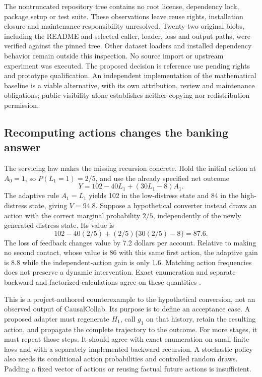 The nontruncated repository tree contains no root license, dependency
lock, package setup or test suite. These observations leave reuse rights,
installation closure and maintenance responsibility unresolved.
Twenty-two original blobs, including the README and selected caller,
loader, loss and output paths, were verified against the pinned tree.
Other dataset loaders and installed dependency behavior remain outside
this inspection. No source import or upstream experiment was executed.
The proposed decision is reference use pending rights and prototype
qualification. An independent implementation of the mathematical
baseline is a viable alternative, with its own attribution, review and
maintenance obligations; public visibility alone establishes neither
copying nor redistribution permission.

\subsection{Recomputing actions changes the banking answer}

The servicing law makes the missing recursion concrete. Hold the initial
action at $A_0=1$, so $P(L_1=1)=2/5$, and use the already specified
net outcome
\[
 Y=102-40L_1+(30L_1-8)A_1.
\]
The adaptive rule $A_1=L_1$ yields 102 in the low-distress state and 84
in the high-distress state, giving $V=94.8$.
Suppose a hypothetical converter instead draws an action with the correct
marginal probability $2/5$, independently of the newly generated distress
state. Its value is
\[
 102-40(2/5)+(2/5)\{30(2/5)-8\}=87.6.
\]
The loss of feedback changes value by 7.2 dollars per account.
Relative to making no second contact, whose value is 86 with this same
first action, the adaptive gain is 8.8 while the independent-action gain
is only 1.6. Matching action frequencies does not preserve a dynamic
intervention. Exact enumeration and separate backward and factorized
calculations agree on these quantities
\citep{exec16_longpolicy_oracle}.

This is a project-authored counterexample to the hypothetical conversion,
not an observed output of CausalCollab. Its purpose is to define an
acceptance case. A proposed adapter must regenerate $H_1$, call $g_1$
on that history, retain the resulting action, and propagate the complete
trajectory to the outcome. For more stages, it must repeat those steps.
It should agree with exact enumeration on small finite laws and with a
separately implemented backward recursion. A stochastic policy also needs
its conditional action probabilities and controlled random draws.
Padding a fixed vector of actions or reusing factual future actions is
insufficient.

